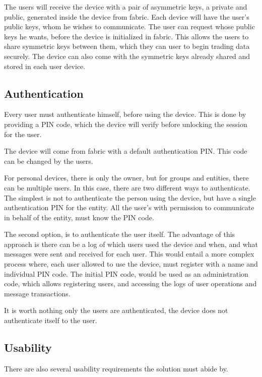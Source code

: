 The users will receive the device with a pair of asymmetric keys, a private and public, generated inside the device from fabric. Each device will have the user's public keys, whom he wishes to communicate. The user can request whose public keys he wants, before the device is initialized in fabric. This allows the users to share symmetric keys between them, which they can user to begin trading data securely. The device can also come with the symmetric keys already shared and stored in each user device.

\subsection{Authentication} \label{chap:problem:services:auth}
Every user must authenticate himself, before using the device. This is done by providing a PIN code, which the device will verify before unlocking the session for the user.

The device will come from fabric with a default authentication PIN. This code can be changed by the users.

For personal devices, there is only the owner, but for groups and entities, there can be multiple users. In this case, there are two different ways to authenticate. The simplest is not to authenticate the person using the device, but have a single authentication PIN for the entity. All the user's with permission to communicate in behalf of the entity, must know the PIN code.

The second option, is to authenticate the user itself. The advantage of this approach is there can be a log of which users used the device and when, and what messages were sent and received for each user.
This would entail a more complex process where, each user allowed to use the device, must register with a name and individual PIN code. The initial PIN code, would be used as an administration code, which allows registering users, and accessing the logs of user operations and message transactions.

It is worth nothing only the users are authenticated, the device does not authenticate itself to the user.

\subsection{Usability} \label{chap:problem:services:usability}
There are also several usability requirements the solution must abide by.

